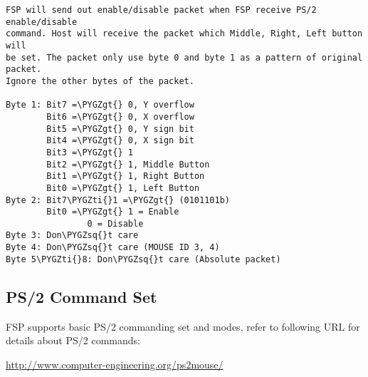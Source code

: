\documentclass[a4paper,8pt,english]{sphinxmanual}
\def\PYGZgt{\char`\>}
\def\PYGZsq{\char`\'}
\def\PYGZti{\char`\~}
\renewcommand\PYGZsq{\textquotesingle}
\begin{document}
\begin{Verbatim}[commandchars=\\\{\}]
FSP will send out enable/disable packet when FSP receive PS/2 enable/disable
command. Host will receive the packet which Middle, Right, Left button will
be set. The packet only use byte 0 and byte 1 as a pattern of original packet.
Ignore the other bytes of the packet.

Byte 1: Bit7 =\PYGZgt{} 0, Y overflow
        Bit6 =\PYGZgt{} 0, X overflow
        Bit5 =\PYGZgt{} 0, Y sign bit
        Bit4 =\PYGZgt{} 0, X sign bit
        Bit3 =\PYGZgt{} 1
        Bit2 =\PYGZgt{} 1, Middle Button
        Bit1 =\PYGZgt{} 1, Right Button
        Bit0 =\PYGZgt{} 1, Left Button
Byte 2: Bit7\PYGZti{}1 =\PYGZgt{} (0101101b)
        Bit0 =\PYGZgt{} 1 = Enable
                0 = Disable
Byte 3: Don\PYGZsq{}t care
Byte 4: Don\PYGZsq{}t care (MOUSE ID 3, 4)
Byte 5\PYGZti{}8: Don\PYGZsq{}t care (Absolute packet)
\end{Verbatim}


\subsection{PS/2 Command Set}
\label{input/devices/sentelic:ps-2-command-set}
FSP supports basic PS/2 commanding set and modes, refer to following URL for
details about PS/2 commands:

\href{http://www.computer-engineering.org/ps2mouse/}{http://www.computer-engineering.org/ps2mouse/}
\end{document}
